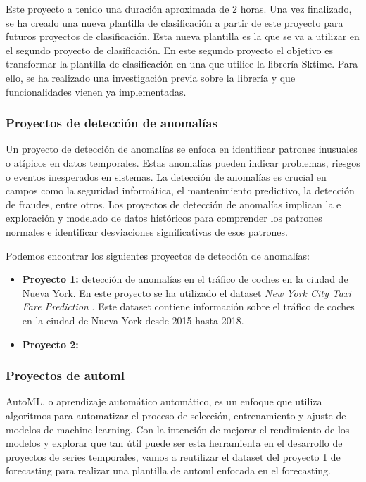 Este proyecto a tenido una duración aproximada de 2 horas. Una vez finalizado, se ha creado una nueva
plantilla de clasificación a partir de este proyecto para futuros proyectos de clasificación. Esta nueva
plantilla es la que se va a utilizar en el segundo proyecto de clasificación. En este segundo proyecto
el objetivo es transformar la plantilla de clasificación en una que utilice la librería Sktime. Para ello,
se ha realizado una investigación previa sobre la librería y que funcionalidades vienen ya implementadas. 

\subsubsection{Proyectos de detección de anomalías}
Un proyecto de detección de anomalías se enfoca en identificar patrones inusuales o 
atípicos en datos temporales. Estas anomalías pueden indicar problemas, riesgos o 
eventos inesperados en sistemas. La detección de anomalías 
es crucial en campos como la seguridad informática, el mantenimiento predictivo, la 
detección de fraudes, entre otros. Los proyectos de detección de anomalías implican la e
exploración y modelado de datos históricos para comprender los patrones normales e identificar 
desviaciones significativas de esos patrones. 

Podemos encontrar los siguientes proyectos de detección de anomalías:
\begin{itemize}
    \item \textbf{Proyecto 1:} detección de anomalías en el tráfico de coches en la ciudad de Nueva York.
    En este proyecto se ha utilizado el dataset \textit{New York City Taxi Fare Prediction} \cite{Traffic_NY}.
    Este dataset contiene información sobre el tráfico de coches en la ciudad de Nueva York desde 2015
    hasta 2018.
    \item \textbf{Proyecto 2:} 
\end{itemize}


\subsubsection{Proyectos de automl}
AutoML, o aprendizaje automático automático, es un enfoque que utiliza algoritmos 
para automatizar el proceso de selección, entrenamiento y ajuste de modelos de 
machine learning. Con la intención de mejorar el rendimiento de los modelos y
explorar que tan útil puede ser esta herramienta en el desarrollo de proyectos
de series temporales, vamos a reutilizar el dataset del proyecto 1 de forecasting
para realizar una plantilla de automl enfocada en el forecasting.\medskip

